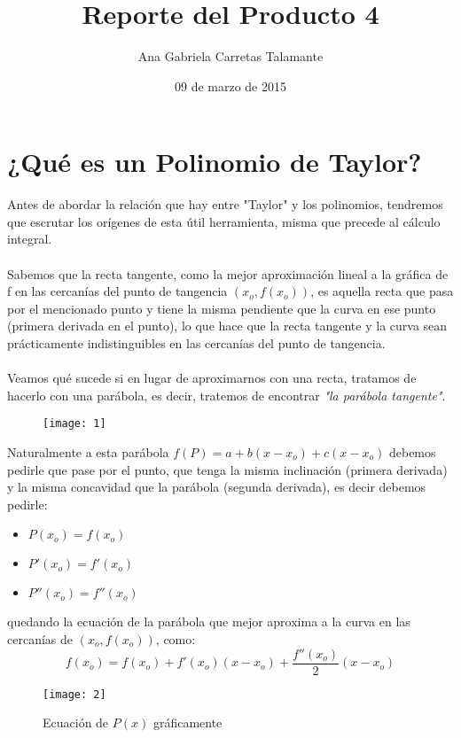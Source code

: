 \documentclass[a4paper]{article}
\title{Reporte del Producto 4}
\author{Ana Gabriela Carretas Talamante}
\date{09 de marzo de 2015}
\begin{document}
\maketitle
\section{¿Qué es un Polinomio de Taylor?}
Antes de abordar la relación que hay entre "Taylor" y los polinomios, tendremos que escrutar los orígenes de esta útil herramienta, misma que precede al cálculo integral. \\ \\
Sabemos que la recta tangente, como la mejor aproximación lineal a la gráfica de f en las cercanías del punto de tangencia $(x_o, f(x_o))$, es aquella recta que pasa por el mencionado punto y tiene la misma pendiente que la curva en ese punto (primera derivada en el punto), lo que hace que la recta tangente y la curva sean prácticamente indistinguibles en las cercanías del punto de tangencia. \\ \\
  
Veamos qué sucede si en lugar de aproximarnos con una recta, tratamos de hacerlo con una parábola, es decir, tratemos de encontrar \textit{"la parábola tangente"}.

\begin{figure}[H]
    \centering
    \texttt{[image: 1]}
  \end{figure} 

Naturalmente a esta parábola $f(P) = a + b(x- x_o) + c(x- x_o)$ debemos pedirle que pase por el punto, que tenga la misma inclinación (primera derivada) y la misma concavidad que la parábola (segunda derivada), es decir debemos pedirle:

\begin{itemize}
\item $P(x_o)=f(x_o)$
\item $P'(x_o)=f'(x_o)$
\item $P''(x_o)=f''(x_o)$
\end{itemize}

quedando la ecuación de la parábola que mejor aproxima a la curva en las cercanías de $(x_o,f(x_o))$, como: $$f(x_o)=f(x_o)+f'(x_o)(x-x_o)+\frac{f''(x_o)}{2}(x-x_o)$$
  \begin{figure}
    \centering
    \texttt{[image: 2]}
    \caption{Ecuación de $P(x)$ gráficamente}
  \end{figure}
\end{document}
